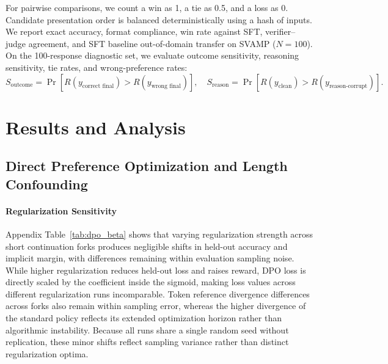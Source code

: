 \documentclass{article}
\begin{document}
For pairwise comparisons, we count a win as 1, a tie as 0.5, and a loss as 0. Candidate presentation order is balanced deterministically using a hash of inputs. We report exact accuracy, format compliance, win rate against SFT, verifier--judge agreement, and SFT baseline out-of-domain transfer on SVAMP \citep{patel2021svamp} ($N = 100$). On the 100-response diagnostic set, we evaluate outcome sensitivity, reasoning sensitivity, tie rates, and wrong-preference rates:
\[
S_{\text{outcome}} = \Pr\left[R(y_{\text{correct final}}) > R(y_{\text{wrong final}})\right], \quad S_{\text{reason}} = \Pr\left[R(y_{\text{clean}}) > R(y_{\text{reason-corrupt}})\right].
\]

\section{Results and Analysis}
\label{sec:results}

\subsection{Direct Preference Optimization and Length Confounding}
\label{sec:results_dpo}

\paragraph{Regularization Sensitivity}
Appendix Table~\ref{tab:dpo_beta} shows that varying regularization strength across short continuation forks produces negligible shifts in held-out accuracy and implicit margin, with differences remaining within evaluation sampling noise. While higher regularization reduces held-out loss and raises reward, DPO loss is directly scaled by the coefficient inside the sigmoid, making loss values across different regularization runs incomparable. Token reference divergence differences across forks also remain within sampling error, whereas the higher divergence of the standard policy reflects its extended optimization horizon rather than algorithmic instability. Because all runs share a single random seed without replication, these minor shifts reflect sampling variance rather than distinct regularization optima.
\end{document}
